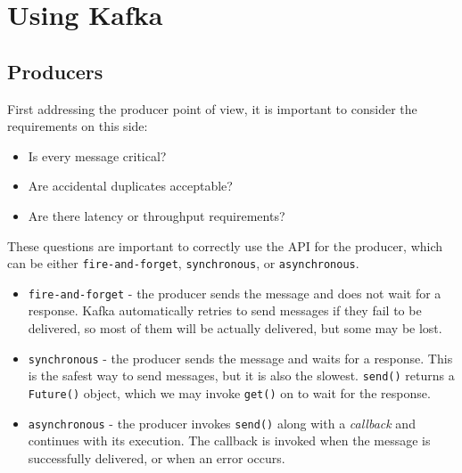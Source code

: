 \section{Using Kafka}


\subsection{Producers}
First addressing the producer point of view, it is important to consider the requirements on this side:
\begin{itemize}
   \item Is every message critical?
   \item Are accidental duplicates acceptable?
   \item Are there latency or throughput requirements?
\end{itemize}
These questions are important to correctly use the API for the producer, which can be either \texttt{fire-and-forget}, \texttt{synchronous}, or \texttt{asynchronous}.

\begin{itemize}
   \item \texttt{fire-and-forget} - the producer sends the message and does not wait for a response. Kafka automatically retries to send messages if they fail to be delivered, so most of them will be actually delivered, but some may be lost.
   \item \texttt{synchronous} - the producer sends the message and waits for a response. This is the safest way to send messages, but it is also the slowest.
   \lstinline|send()| returns a \lstinline|Future()| object, which we may invoke \lstinline|get()| on to wait for the response.
   \item \texttt{asynchronous} - the producer invokes \lstinline|send()| along with a \textit{callback} and continues with its execution.
   The callback is invoked when the message is successfully delivered, or when an error occurs.
\end{itemize}

